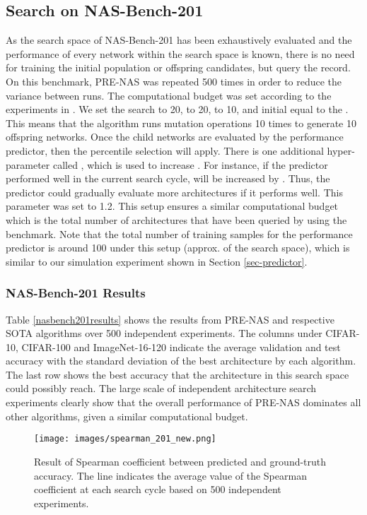 \documentclass[sigconf]{acmart}
\begin{document}
\subsection{Search on NAS-Bench-201}
\label{search_on_nasbench201}
As the search space of NAS-Bench-201 has been exhaustively evaluated and the performance of every network within the search space is known, there is no need for training the initial population or offspring candidates, but query the record.  On this benchmark, PRE-NAS was repeated 500 times in order to reduce the variance between runs. The computational budget was set according to the experiments in \cite{Ref:45}. We set the search  to 20,   to 20,  to 10, and initial  equal to the .  This means that the algorithm runs mutation operations 10 times to generate 10 offspring networks.  Once the child networks are evaluated by the performance predictor, then the percentile selection will apply.  There is one additional hyper-parameter called , which is used to increase .  For instance, if the predictor performed well in the current search cycle,  will be increased by .  Thus, the predictor could gradually evaluate more architectures if it performs well.  This parameter was set to 1.2.  This setup ensures a similar computational budget which is the total number of architectures that have been queried by using the benchmark. Note that the total number of training samples for the performance predictor is around 100 under this setup (approx.  of the search space), which is similar to our simulation experiment shown in Section \ref{sec-predictor}.

\subsubsection{NAS-Bench-201 Results}
Table \ref{nasbench201results} shows the results from PRE-NAS and respective SOTA algorithms over 500 independent experiments.  The columns under CIFAR-10, CIFAR-100 and ImageNet-16-120 indicate the average validation and test accuracy with the standard deviation of the best architecture by each algorithm.  The last row shows the best accuracy that the architecture in this search space could possibly reach. The large scale of independent architecture search experiments clearly show that the overall performance of PRE-NAS dominates all other algorithms, given a similar computational budget.

 \begin{figure}[!h]
\centering
  	\texttt{[image: images/spearman\_201\_new.png]}
  	\caption{Result of Spearman coefficient between predicted and ground-truth accuracy. The line indicates the average value of the Spearman coefficient at each search cycle based on 500 independent experiments.
  	}
  	\label{spearman201}
\end{figure}
\end{document}
